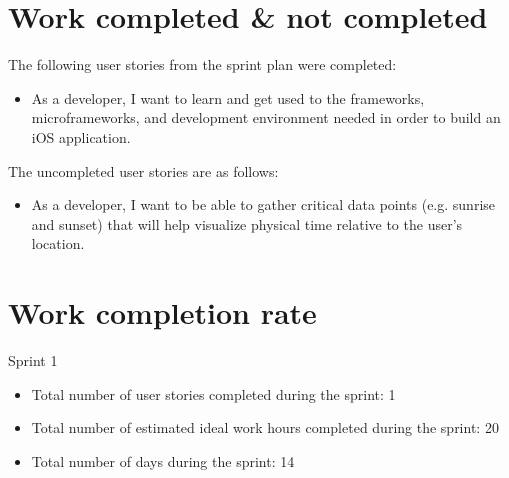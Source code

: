 \documentclass[11pt]{article}
\begin{document}
	\section{Work completed \& not completed}
		\vspace{-3mm}
		\normalsize{The following user stories from the sprint plan were completed:}\\
		\vspace{-3mm}
		\begin{itemize}
			\item As a developer, I want to learn and get used to the frameworks, microframeworks, and development environment needed in order to build an iOS application.
		\end{itemize}
		\vspace{-3mm}
		\normalsize{The uncompleted user stories are as follows:}\\
		\vspace{-3mm}
		\begin{itemize}		
			\item As a developer, I want to be able to gather critical data points (e.g. sunrise and sunset) that will help visualize physical time relative to the user's location.
		\end{itemize}
		\vspace{-3mm}
		
	\section{Work completion rate}
		\vspace{-3mm}
		\normalsize{Sprint 1}\\
		\vspace{-3mm}
		\begin{itemize}
			\item Total number of user stories completed during the sprint: 1
			\vspace{-3mm}
			\item Total number of estimated ideal work hours completed during the sprint: 20
			\vspace{-3mm}
			\item Total number of days during the sprint: 14
		\end{itemize}
	
\end{document}
